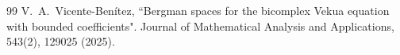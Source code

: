 \documentclass[12pt]{article}
\begin{document}
\begin{thebibliography}{99}
 V.~A.~Vicente-Benítez, ``Bergman spaces for the bicomplex Vekua equation with bounded coefficients". Journal of Mathematical Analysis and Applications, 543(2), 129025 (2025).


	

\end{thebibliography}

%
%
\end{document}
